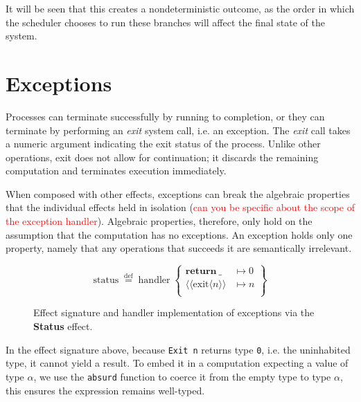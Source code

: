 \documentclass[logo,bsc,singlespacing,parskip]{infthesis}
\begin{document}
It will be seen that this creates a nondeterministic outcome, as the order in which the scheduler chooses to run these branches will affect the final state of the system. 


\section{Exceptions}
Processes can terminate successfully by running to completion, or they can terminate by performing an \textit{exit} system call, i.e. an exception. The \textit{exit} call takes a numeric argument indicating the exit status of the process. Unlike other operations, exit does not allow for continuation; it discards the remaining computation and terminates execution immediately.

When composed with other effects, exceptions can break the algebraic properties that the individual effects held in isolation (\textcolor{red}{can you be specific about the scope of the exception handler}). Algebraic properties, therefore, only hold on the assumption that the computation has no exceptions. An exception holds only one property, namely that any operations that succeeds it are semantically irrelevant.


\begin{figure}[H]
\centering


\vspace{-1em}

\[
\mathrm{status} \;\overset{\mathrm{def}}{=}\;
\mathrm{handler} \;\left\{
\begin{array}{ll}
  \mathrm{\textbf{return}\:\_} & \mapsto 0 \\[0.5ex]
  \langle\!\langle \mathrm{exit} \langle n\rangle\rangle & \mapsto n \\[0.5ex]
\end{array}
\right\}
\]

\caption{Effect signature and handler implementation of exceptions via the \textbf{Status} effect.}
\label{fig:status-handler}
\end{figure}

In the effect signature above, because \lstinline{Exit n} returns type \lstinline{0}, i.e. the uninhabited type, it cannot yield a result. To embed it in a computation expecting a value of type $\alpha$, we use the \lstinline{absurd} function to coerce it from the empty type to type $\alpha$, this ensures the expression remains well-typed.
\end{document}
